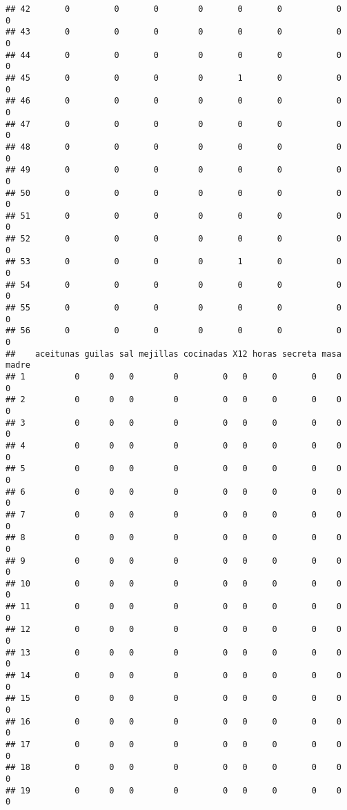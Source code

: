 \documentclass[
]{article}
\begin{document}
\begin{verbatim}
## 42       0         0       0        0       0       0           0       0
## 43       0         0       0        0       0       0           0       0
## 44       0         0       0        0       0       0           0       0
## 45       0         0       0        0       1       0           0       0
## 46       0         0       0        0       0       0           0       0
## 47       0         0       0        0       0       0           0       0
## 48       0         0       0        0       0       0           0       0
## 49       0         0       0        0       0       0           0       0
## 50       0         0       0        0       0       0           0       0
## 51       0         0       0        0       0       0           0       0
## 52       0         0       0        0       0       0           0       0
## 53       0         0       0        0       1       0           0       0
## 54       0         0       0        0       0       0           0       0
## 55       0         0       0        0       0       0           0       0
## 56       0         0       0        0       0       0           0       0
##    aceitunas guilas sal mejillas cocinadas X12 horas secreta masa madre
## 1          0      0   0        0         0   0     0       0    0     0
## 2          0      0   0        0         0   0     0       0    0     0
## 3          0      0   0        0         0   0     0       0    0     0
## 4          0      0   0        0         0   0     0       0    0     0
## 5          0      0   0        0         0   0     0       0    0     0
## 6          0      0   0        0         0   0     0       0    0     0
## 7          0      0   0        0         0   0     0       0    0     0
## 8          0      0   0        0         0   0     0       0    0     0
## 9          0      0   0        0         0   0     0       0    0     0
## 10         0      0   0        0         0   0     0       0    0     0
## 11         0      0   0        0         0   0     0       0    0     0
## 12         0      0   0        0         0   0     0       0    0     0
## 13         0      0   0        0         0   0     0       0    0     0
## 14         0      0   0        0         0   0     0       0    0     0
## 15         0      0   0        0         0   0     0       0    0     0
## 16         0      0   0        0         0   0     0       0    0     0
## 17         0      0   0        0         0   0     0       0    0     0
## 18         0      0   0        0         0   0     0       0    0     0
## 19         0      0   0        0         0   0     0       0    0     0

\end{verbatim}
\end{document}

